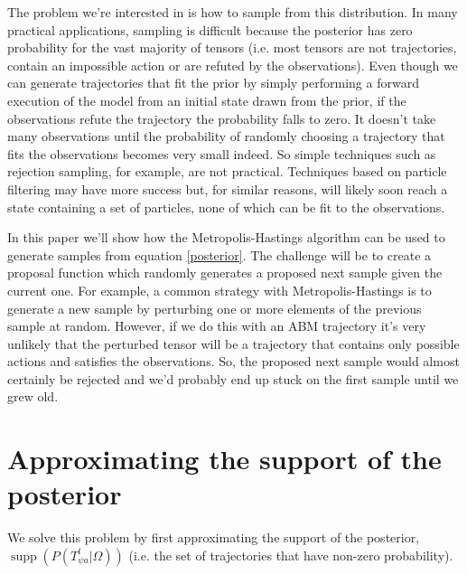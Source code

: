 \documentclass{article}
\DeclareMathOperator\supp{supp}
\begin{document}
The problem we're interested in is how to sample from this distribution. In many practical applications, sampling is difficult because the posterior has zero probability for the vast majority of tensors (i.e. most tensors are not trajectories, contain an impossible action or are refuted by the observations). Even though we can generate trajectories that fit the prior by simply performing a forward execution of the model from an initial state drawn from the prior, if the observations refute the trajectory the probability falls to zero. It doesn't take many observations until the probability of randomly choosing a trajectory that fits the observations becomes very small indeed. So simple techniques such as rejection sampling, for example, are not practical. Techniques based on particle filtering may have more success but, for similar reasons, will likely soon reach a state containing a set of particles, none of which can be fit to the observations.

In this paper we'll show how the Metropolis-Hastings algorithm can be used to generate samples from equation \ref{posterior}. The challenge will be to create a proposal function which randomly generates a proposed next sample given the current one. For example, a common strategy with Metropolis-Hastings is to generate a new sample by perturbing one or more elements of the previous sample at random. However, if we do this with an ABM trajectory it's very unlikely that the perturbed tensor will be a trajectory that contains only possible actions and satisfies the observations. So, the proposed next sample would almost certainly be rejected and we'd probably end up stuck on the first sample until we grew old.

\section{Approximating the support of the posterior}

We solve this problem by first approximating the support of the posterior, $\supp(P(T^t_{\psi a}|\Omega))$ (i.e. the set of trajectories that have non-zero probability).
\end{document}
